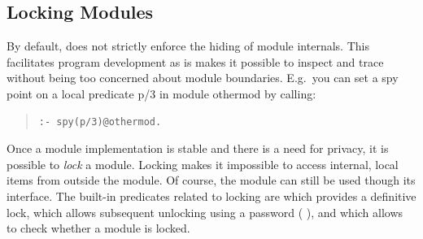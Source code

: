 \subsection{Locking Modules}
\label{locking}
By default, {\eclipse} does not strictly enforce the hiding of
module internals. This facilitates program development as is makes
it possible to inspect and trace without being too concerned about module
boundaries. E.g.\ you can set a spy point on a local predicate p/3
in module othermod by calling:
\begin{quote}\begin{verbatim}
:- spy(p/3)@othermod.
\end{verbatim}\end{quote}
Once a module implementation is stable and there is a need for privacy,
it is possible to {\em lock} a module. Locking makes it impossible
to access internal, local items from outside the module. Of course,
the module can still be used though its interface.
The built-in predicates related to locking are
 which provides
a definitive lock,
which allows subsequent unlocking using a password (
),
and
which allows to check whether a module is locked.

